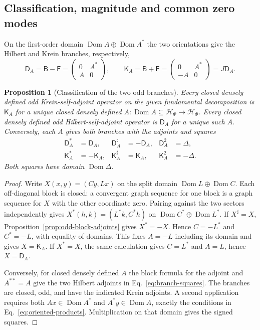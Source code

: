 \documentclass[11pt]{article}
\newtheorem{proposition}{Proposition}[section]
\theoremstyle{definition}
\begin{document}
\subsection{Classification, magnitude and common zero modes}

On the first-order domain $\operatorname{Dom}A\oplus\operatorname{Dom}A^*$ the two orientations give the Hilbert and Krein branches, respectively,
\begin{equation}
 \mathsf D_A=\mathsf B-\mathsf F=\begin{pmatrix}0&A^*\\A&0\end{pmatrix},
 \qquad
 \mathsf K_A=\mathsf B+\mathsf F=\begin{pmatrix}0&A^*\\-A&0\end{pmatrix}
 =J\mathsf D_A .
 \label{eq:weighted-channel-branches}
\end{equation}
\begin{proposition}[Classification of the two odd branches]
\label{prop:odd-channel-branches}
Every closed densely defined odd Krein-self-adjoint operator on the given fundamental decomposition is $\mathsf K_A$ for a unique closed densely defined $A:\operatorname{Dom}A\subseteq\mathcal H_\Psi\to\mathcal H_\Phi$. Every closed densely defined odd Hilbert-self-adjoint operator is $\mathsf D_A$ for a unique such $A$. Conversely, each $A$ gives both branches with the adjoints and squares
\begin{equation}
\begin{aligned}
 \mathsf D_A^*&=\mathsf D_A,&\mathsf D_A^\sharp&=-\mathsf D_A,&\mathsf D_A^2&=\Delta,\\
 \mathsf K_A^*&=-\mathsf K_A,&\mathsf K_A^\sharp&=\mathsf K_A,&\mathsf K_A^2&=-\Delta .
\end{aligned}
 \label{eq:branch-squares}
\end{equation}
Both squares have domain $\operatorname{Dom}\Delta$.
\end{proposition}
\begin{proof}
Write $X(x,y)=(Cy,Lx)$ on the split domain $\operatorname{Dom}L\oplus\operatorname{Dom}C$. Each off-diagonal block is closed: a convergent graph sequence for one block is a graph sequence for $X$ with the other coordinate zero. Pairing against the two sectors independently gives $X^*(h,k)=(L^*k,C^*h)$ on $\operatorname{Dom}C^*\oplus\operatorname{Dom}L^*$. If $X^\sharp=X$, Proposition~\ref{prop:odd-block-adjoints} gives $X^*=-X$. Hence $C=-L^*$ and $C^*=-L$, with equality of domains. This fixes $A=-L$ including its domain and gives $X=\mathsf K_A$. If $X^*=X$, the same calculation gives $C=L^*$ and $A=L$, hence $X=\mathsf D_A$.

Conversely, for closed densely defined $A$ the block formula for the adjoint and $A^{**}=A$ give the two Hilbert adjoints in Eq.~\eqref{eq:branch-squares}. The branches are closed, odd, and have the indicated Krein adjoints. A second application requires both $Ax\in\operatorname{Dom}A^*$ and $A^*y\in\operatorname{Dom}A$, exactly the conditions in Eq.~\eqref{eq:oriented-products}. Multiplication on that domain gives the signed squares.
\end{proof}
\end{document}
